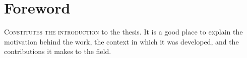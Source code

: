 \chapter*{Foreword}
\label{cha:foreword}



\lettrine{C}{onstitutes the introduction} to the thesis.
It is a good place to explain the
motivation behind the work, the context in which it was developed, and the
contributions it makes to the field.

\lipsum[1-2]


